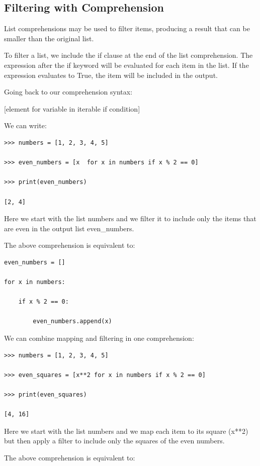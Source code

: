 \documentclass{article}
\begin{document}
\subsection{Filtering with Comprehension}
List comprehensions may be used to filter items, producing a result that can be smaller than the original list.

To filter a list, we include the if clause at the end of the list comprehension. The expression after the if keyword will be evaluated for each item in the list. If the expression evaluates to True, the item will be included in the output. 

Going back to our comprehension syntax:

[element for variable in iterable if condition]

We can write:

\begin{lstlisting}
>>> numbers = [1, 2, 3, 4, 5]

>>> even_numbers = [x  for x in numbers if x % 2 == 0]

>>> print(even_numbers) 

[2, 4]
\end{lstlisting}

Here we start with the list numbers and we filter it to include only the items that are even in the output list even{\_}numbers.

The above comprehension is equivalent to:

\begin{lstlisting}
even_numbers = []

for x in numbers:

    if x % 2 == 0:        

        even_numbers.append(x)
\end{lstlisting}

We can combine mapping and filtering in one comprehension:

\begin{lstlisting}
>>> numbers = [1, 2, 3, 4, 5]

>>> even_squares = [x**2 for x in numbers if x % 2 == 0]

>>> print(even_squares) 

[4, 16]
\end{lstlisting}

Here we start with the list numbers and we map each item to its square (x**2) but then apply a filter to include only the squares of the even numbers.

The above comprehension is equivalent to:
\end{document}
